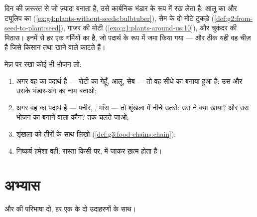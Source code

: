 \begin{example}[पौधे का अपना भंडार-घर]\label{ex:g6:plants-are-producers:pantry}
 दिन की ज़रूरत से जो ज़्यादा बनाता है, उसे कार्बनिक भंडार के रूप में
रख लेता है: आलू का  और ट्यूलिप का 
(\cref{ex:g4:plants-without-seeds:bulbtuber}), सेम के दो मोटे टुकड़े
(\cref{def:g2:from-seed-to-plant:seed}), गाजर की मोटी 
(\cref{exo:g1:plants-around-us:10}), और चुकंदर की मिठास। इनमें से हर एक
गर्मियों का  है, जो पदार्थ के रूप में जमा किया गया --- और ठीक यही
वह चीज़ है जिसे किसान तथा खाने वाले काटते हैं।
\end{example}

\begin{method}\label{met:g6:plants-are-producers:trace}
मेज़ पर रखा कोई भी भोजन लो:
\begin{enumerate}
  \item अगर वह  का पदार्थ है --- रोटी का गेहूँ, आलू, सेब --- तो
        वह सीधे  का बनाया हुआ है: उस  और उसके भंडार-अंग का
        नाम बताओ;
  \item अगर वह  का पदार्थ है --- पनीर, , माँस --- तो शृंखला
        में नीचे उतरो: उस  ने क्या खाया? और उस भोजन का बनाने वाला
        कौन?  तक चलते जाओ;
  \item शृंखला को तीरों के साथ लिखो
        (\cref{def:g3:food-chains:chain});
  \item निष्कर्ष हमेशा वही: रास्ता किसी  पर,  में जाकर
        ख़त्म होता है।
\end{enumerate}
\end{method}

\section{अभ्यास}

\begin{exercise}[$\star$]\label{exo:g6:plants-are-producers:1}
 और  की परिभाषा दो, हर एक के दो उदाहरणों के
साथ।
\end{exercise}


